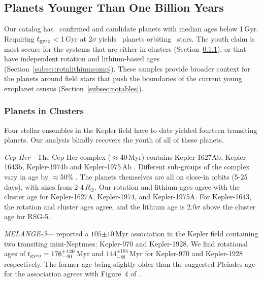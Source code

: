 \documentclass[11pt,twocolumn,tighten]{aastex63}
\begin{document}
\subsection{Planets Younger Than One Billion Years}

Our catalog has \nplyounggyro\ confirmed
and candidate planets with median ages below 1\,Gyr.  Requiring
$t_{\rm gyro}$$<$1\,Gyr at 2$\sigma$ yields \nplyounggyrotwosigma\
planets orbiting \nplhostsyounggyrotwosigma\ stars.  The youth claim
is most secure for the systems that are either in clusters
(Section~\ref{subsec:clusterplanets}), or that have independent
rotation and lithium-based ages
(Section~\ref{subsec:rotnlithiumcomp}).  These samples provide broader
context for the planets around field stars that push the boundaries of
the current young exoplanet census (Section~\ref{subsec:notables}).

\subsubsection{Planets in Clusters}
\label{subsec:clusterplanets}

Four stellar ensembles in the Kepler field have to date yielded
fourteen transiting planets.  Our analysis
blindly recovers the youth of all of these planets.

{\it Cep-Her}---The Cep-Her complex ($\approx$40\,Myr) contains
Kepler-1627Ab, Kepler-1643b, Kepler-1974b and Kepler-1975\,Ab
\citep{Bouma_2022a,Bouma_2022b}.  Different sub-groups of the complex
vary in age by $\approx$50\% \citep{Kerr2024}.  The planets
themselves are all on close-in orbits (5-25\,days), with sizes from
2-4\,$R_\oplus$.  Our rotation and lithium ages agree with the cluster
age for Kepler-1627A, Kepler-1974, and Kepler-1975A.  For Kepler-1643,
the rotation and cluster ages agree, and the lithium age is
2.0$\sigma$ above the cluster age  \citet{Bouma_2022b} for
RSG-5.

{\it MELANGE-3}---\citet{Barber_2022} reported a $105$$\pm$$10$\,Myr
association in the Kepler field containing two transiting
mini-Neptunes: Kepler-970 and Kepler-1928.  We find rotational
ages of $t_{\rm gyro}=176_{-40}^{+120}$\,Myr and
$144_{-88}^{+104}$\,Myr for Kepler-970 and Kepler-1928 respectively.
The former \deleted{rotation-based }age being slightly older than the suggested
Pleiades age for the association agrees with Figure~4 of
\citet{Barber_2022}.
\end{document}

